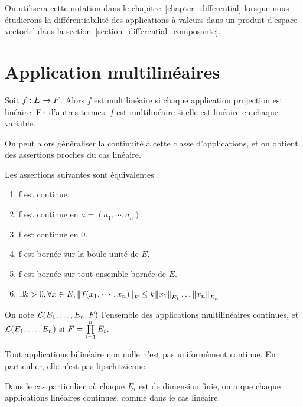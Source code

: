 On utilisera cette notation dans le chapitre~\ref{chapter_differential} lorsque nous
étudierons la différentiabilité des applications à valeurs dans un produit
d'espace vectoriel dans la section~\ref{section_differential_composante}.

\section{Application multilinéaires}

\begin{definition}
	Soit $f : E \rightarrow F$. Alors $f$ est multilinéaire si chaque
	application projection est linéaire. En d'autres termes, $f$ est
	multilinéaire si elle est linéaire en chaque variable.
\end{definition}

On peut alors généraliser la continuité à cette classe d'applications, et on
obtient des assertions proches du cas linéaire.

\begin{proposition}
	Les assertions suivantes sont équivalentes :

	\begin{enumerate}
		\item f est continue.
		\item f est continue en $a = (a_{1}, \cdots, a_{n})$.
		\item f est continue en $0$.
		\item f est bornée sur la boule unité de $E$.
		\item f est bornée sur tout ensemble bornée de $E$.
		\item $\exists k > 0, \forall x \in E, \norm{f(x_{1}, \cdots,
			x_{n})}_{F} \leq k \norm{x_{1}}_{E_{1}} \ldots
			\norm{x_{n}}_{E_{n}}$
	\end{enumerate}
\end{proposition}

On note $\mathcal{L}(E_{1}, \ldots, E_{n}, F)$ l'ensemble des applications
multilinéaires continues, et $\mathcal{L}(E_{1}, \ldots, E_{n})$ si $F = 
\prod\limits_{i = 1}^{n} E_{i}$.

\begin{remarque}
	Tout applications bilinéaire non nulle n'est pas uniformément continue. En
	particulier, elle n'est pas lipschitzienne.
\end{remarque}

Dans le cas particulier où chaque $E_{i}$ est de dimension finie, on a que
chaque applications linéaires continues, comme dans le cas linéaire.

